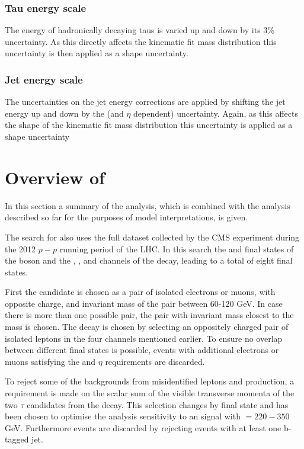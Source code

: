 \subsubsection*{Tau energy scale}
The energy of hadronically decaying taus is varied up and down by its 3\% uncertainty. As this directly affects the kinematic fit mass distribution this uncertainty is then applied as a shape uncertainty.

\subsubsection*{Jet energy scale}
The uncertainties on the jet energy corrections are applied by shifting the jet energy up and down by the (\pT and $\eta$ dependent) uncertainty. Again, as this affects the shape of the kinematic fit mass distribution this uncertainty is applied as a shape uncertainty 


\section{\texorpdfstring{Overview of \AtoZhtolltautau}{Overview of A->Zh->lltautau}}
\label{sec:hhh_azh}
In this section a summary of the \AtoZhtolltautau analysis, which is combined with the 
analysis described so far for the purposes of model interpretations, is given.

The search for \AtoZhtolltautau also uses the full dataset collected by the CMS experiment during
the 2012 $p-p$ running period of the LHC. In this search the \mumu and \ee final states of the \PZ boson
and the \emu, \etau, \mutau and \tautau channels of the \htotautau decay, leading to a total of
eight final states. 

First the \PZ candidate is chosen as a pair of isolated electrons or muons, with opposite charge, and 
invariant mass of the pair between 60-120 GeV. In case there is more than one possible pair, the 
pair with invariant mass closest to the \PZ mass is chosen. The \htotautau decay is chosen by selecting
an oppositely charged pair of isolated leptons in the four channels mentioned earlier. To ensure no overlap
between different final states is possible, events with additional electrons or muons satisfying the
\pT and $\eta$ requirements are discarded.

To reject some of the backgrounds from misidentified leptons and \ZZ production, a requirement is made
on the scalar sum of the visible transverse momenta of the two $\tau$ candidates from the \htotautau decay.
This selection changes by final state and has been chosen to optimise the analysis sensitivity to an 
\AtoZh signal with \mA $= 220 - 350 $ GeV. Furthermore \ttbar events are discarded by rejecting
events with at least one b-tagged jet. 

